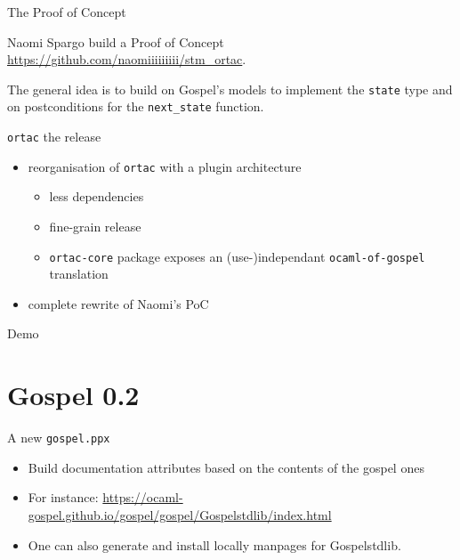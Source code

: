\documentclass[pdf]{beamer}
\begin{document}
\begin{frame}{The Proof of Concept}

  Naomi Spargo build a Proof of Concept \url{https://github.com/naomiiiiiiiii/stm_ortac}.

  The general idea is to build on Gospel's models to implement the
  \texttt{state} type and on postconditions for the \texttt{next\_state} function.

\end{frame}

\begin{frame}{\texttt{ortac} the release}

  \begin{itemize}
    \item reorganisation of \texttt{ortac} with a plugin architecture
      \begin{itemize}
        \item less dependencies
        \item fine-grain release
        \item \texttt{ortac-core} package exposes an (use-)independant
          \texttt{ocaml-of-gospel} translation
      \end{itemize}
    \item complete rewrite of Naomi's PoC
  \end{itemize}

\end{frame}

\begin{frame}
  \centering
  \huge{Demo}
\end{frame}

\section{Gospel 0.2}

\begin{frame}{A new \texttt{gospel.ppx}}

  \begin{itemize}
    \item Build documentation attributes based on the contents of the gospel ones
    \item For instance: \url{https://ocaml-gospel.github.io/gospel/gospel/Gospelstdlib/index.html}
    \item One can also generate and install locally manpages for Gospelstdlib.
  \end{itemize}

\end{frame}
\end{document}
